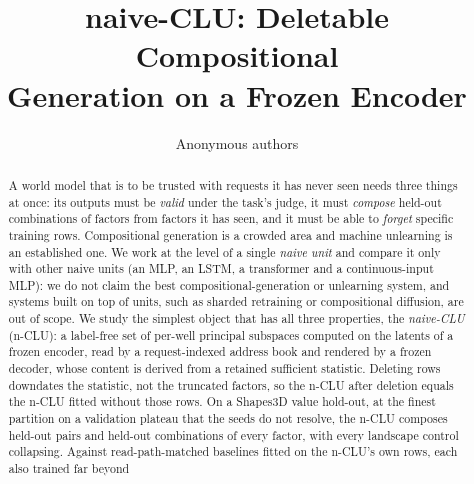 \documentclass{article} %
\title{naive-CLU: Deletable Compositional\\ Generation on a Frozen Encoder}
\author{Anonymous authors}
\begin{document}
\maketitle

\begin{abstract}
A world model that is to be trusted with requests it has never seen needs three things at
once: its outputs must be \emph{valid} under the task's judge, it must \emph{compose}
held-out combinations of factors from factors it has seen, and it must be able to
\emph{forget} specific training rows. Compositional generation is a crowded area
and machine unlearning is an established one. We work at the level of a single \emph{naive unit} and
compare it only with other naive units (an MLP, an LSTM, a transformer and a continuous-input MLP):
we do not claim the best compositional-generation or unlearning system, and systems built on top of
units, such as sharded retraining or compositional diffusion, are out of scope.
We study the simplest object that has all three properties, the \emph{naive-CLU} (n-CLU): a
label-free set of per-well principal subspaces computed on the latents of a frozen
encoder, read by a request-indexed address book and rendered by a frozen decoder, whose
content is derived from a retained sufficient statistic. Deleting rows downdates the
statistic, not the truncated factors, so the n-CLU after deletion equals the n-CLU fitted
without those rows. On a Shapes3D value hold-out, at the finest partition on a validation plateau
that the seeds do not resolve, %
the n-CLU composes held-out pairs and held-out combinations of every factor, with every landscape
control collapsing. %
Against read-path-matched baselines fitted on the n-CLU's own rows, each also trained far beyond

\end{abstract}
\end{document}
